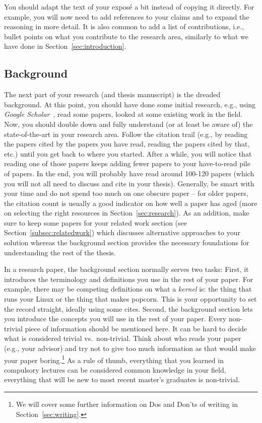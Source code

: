 \documentclass[a4paper]{article}
\begin{document}
You should adapt the text of your expos\'e a bit instead of copying it directly.
For example, you will now need to add references to your claims and to expand the reasoning in more detail.
It is also common to add a list of contributions, i.e., bullet points on what you contribute to the research area, similarly to what we have done in Section~\ref{sec:introduction}.

\subsection{Background}

The next part of your research (and thesis manuscript) is the dreaded background.
At this point, you should have done some initial research, e.g., using \emph{Google Scholar}~\cite{gscholar}, read some papers, looked at some existing work in the field.
Now, you should double down and fully understand (or at least be aware of) the state-of-the-art in your research area.
Follow the citation trail (e.g., by reading the papers cited by the papers you have read, reading the papers cited by that, etc.) until you get back to where you started.
After a while, you will notice that reading one of those papers keeps adding fewer papers to your have-to-read pile of papers.
In the end, you will probably have read around 100-120 papers (which you will not all need to discuss and cite in your thesis).
Generally, be smart with your time and do not spend too much on one obscure paper -- for older papers, the citation count is usually a good indicator on how well a paper has aged (more on selecting the right resources in Section~\ref{sec:research}).
As an addition, make sure to keep some papers for your related work section (see Section~\ref{subsec:relatedwork}) which discusses alternative approaches to your solution whereas the background section provides the necessary foundations for understanding the rest of the thesis.

In a research paper, the background section normally serves two tasks:
First, it introduces the terminology and definitions you use in the rest of your paper.
For example, there may be competing definitions on what a \emph{kernel} is: the thing that runs your Linux or the thing that makes popcorn.
This is your opportunity to set the record straight, ideally using some cites.
Second, the background section lets you introduce the concepts you will use in the rest of your paper.
Every non-trivial piece of information should be mentioned here.
It can be hard to decide what is considered trivial vs.~non-trivial.
Think about who reads your paper (e.g., your advisor) and try not to give too much information as that would make your paper boring.\footnote{We will cover some further information on Dos and Don'ts of writing in Section~\ref{sec:writing}.}
As a rule of thumb, everything that you learned in compulsory lectures can be considered common knowledge in your field, everything that will be new to most recent master's graduates is non-trivial.
\end{document}
